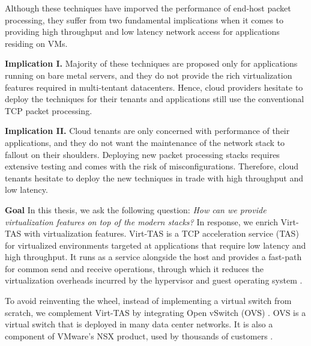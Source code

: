 Although these techniques have imporved the performance of end-host packet processing, they 
suffer from two fundamental implications when it comes to providing high throughput and 
low latency network access for applications residing on VMs.


\textbf{Implication I.} Majority of these techniques are proposed only for applications running
on bare metal servers, and they do not provide the rich virtualization features required in 
multi-tentant datacenters. Hence, cloud providers hesitate to deploy the techniques for
their tenants and applications still use the conventional TCP packet processing.

\textbf{Implication II.} Cloud tenants are only concerned with performance of their applications,
and they do not want the maintenance of the network stack to fallout on their shoulders. Deploying 
new packet processing stacks requires extensive testing and comes with the risk of 
misconfigurations. Therefore, cloud tenants hesitate to deploy the new techniques in trade with
high throughput and low latency.

\textbf{Goal} In this thesis, we ask the following question: \emph{How can we provide virtualization 
features on top of the modern stacks?} In response, we enrich Virt-TAS with virtualization features.
Virt-TAS is a TCP acceleration service (TAS) for virtualized environments targeted at applications 
that require low latency and high throughput. It runs as a service alongside the host and provides 
a fast-path for common send and receive operations, through which it reduces the virtualization 
overheads incurred by the hypervisor and guest operating system \cite{florian2021virttas}. 

To avoid reinventing the wheel, instead of implementing a virtual switch from scratch, we
complement Virt-TAS by integrating Open vSwitch (OVS) \cite{pfaff2015design}. OVS is a virtual
switch that is deployed in many data center networks. It is also a component of VMware's NSX 
product, used by thousands of customers \cite{tu2021revisiting}.


